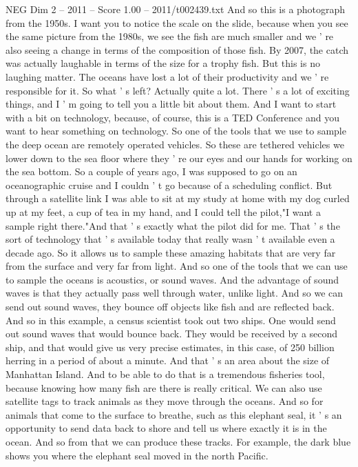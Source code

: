\begin{textsample}{NEG Dim 2 – 2011 – Score 1.00 – 2011/t002439.txt}
And so this is a photograph from the 1950s.
I want you to notice the scale on the slide, because when you see the same picture from the 1980s, we see the fish are much smaller and we ' re also seeing a change in terms of the composition of those fish.
By 2007, the catch was actually laughable in terms of the size for a trophy fish.
But this is no laughing matter.
The oceans have lost a lot of their productivity and we ' re responsible for it.
So what ' s left?
Actually quite a lot.
There ' s a lot of exciting things, and I ' m going to tell you a little bit about them.
And I want to start with a bit on technology, because, of course, this is a TED Conference and you want to hear something on technology.
So one of the tools that we use to sample the deep ocean are remotely operated vehicles.
So these are tethered vehicles we lower down to the sea floor where they ' re our eyes and our hands for working on the sea bottom.
So a couple of years ago, I was supposed to go on an oceanographic cruise and I couldn ' t go because of a scheduling conflict.
But through a satellite link I was able to sit at my study at home with my dog curled up at my feet, a cup of tea in my hand, and I could tell the pilot,"I want a sample right there."And that ' s exactly what the pilot did for me.
That ' s the sort of technology that ' s available today that really wasn ' t available even a decade ago.
So it allows us to sample these amazing habitats that are very far from the surface and very far from light.
And so one of the tools that we can use to sample the oceans is acoustics, or sound waves.
And the advantage of sound waves is that they actually pass well through water, unlike light.
And so we can send out sound waves, they bounce off objects like fish and are reflected back.
And so in this example, a census scientist took out two ships.
One would send out sound waves that would bounce back.
They would be received by a second ship, and that would give us very precise estimates, in this case, of 250 billion herring in a period of about a minute.
And that ' s an area about the size of Manhattan Island.
And to be able to do that is a tremendous fisheries tool, because knowing how many fish are there is really critical.
We can also use satellite tags to track animals as they move through the oceans.
And so for animals that come to the surface to breathe, such as this elephant seal, it ' s an opportunity to send data back to shore and tell us where exactly it is in the ocean.
And so from that we can produce these tracks.
For example, the dark blue shows you where the elephant seal moved in the north Pacific.

\end{textsample}
